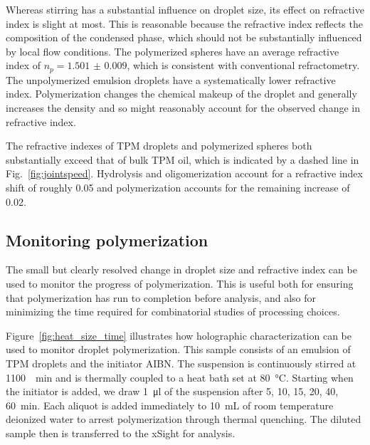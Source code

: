 \documentclass[journal=langd5,manuscript=article]{achemso}
\begin{document}
Whereas stirring has a substantial influence on droplet size,
its effect on refractive index is slight at most.
This is reasonable because the refractive index reflects
the composition of the condensed phase, which should not
be substantially influenced by local flow conditions.
The polymerized spheres have an average refractive index of
$n_p = \num{1.501(9)}$, which is consistent with conventional
refractometry.
The unpolymerized emulsion droplets have a systematically 
lower refractive index.
Polymerization changes the chemical makeup of the droplet and
generally increases the density %
and so might reasonably account for the observed change in refractive index.

The refractive indexes of TPM droplets and polymerized spheres both
substantially exceed that of bulk TPM oil, which is indicated by
a dashed line in Fig.~\ref{fig:jointspeed}.
Hydrolysis and oligomerization account for a refractive
index shift of roughly \num{0.05} and polymerization accounts for the remaining
increase of \num{0.02}.

\subsection{Monitoring polymerization}
\label{sec:monitoring}

The small but clearly resolved 
change in droplet size and refractive index can be
used to monitor the progress of polymerization.
This is useful both for ensuring that polymerization has run
to completion before analysis, and also for minimizing the
time required for combinatorial studies of processing choices.

Figure~\ref{fig:heat_size_time} illustrates how
holographic characterization can be used to monitor
droplet polymerization.  This sample
consists of an emulsion of TPM droplets and 
the initiator AIBN.
The suspension is continuously stirred at 
\SI{1100}{\per\minute}
and is thermally coupled to a heat bath set at \SI{80}{\degreeCelsius}.
Starting when the initiator is added,
we draw \SI{1}{\ul} of the suspension after 
\num{5}, \num{10}, \num{15},
\num{20}, \num{40}, \SI{60}{\minute}.
Each aliquot is added immediately 
to \SI{10}{\milli\liter} of room temperature deionized water
to arrest polymerization through thermal quenching.
The diluted sample then is transferred to the xSight
for analysis.
\end{document}
